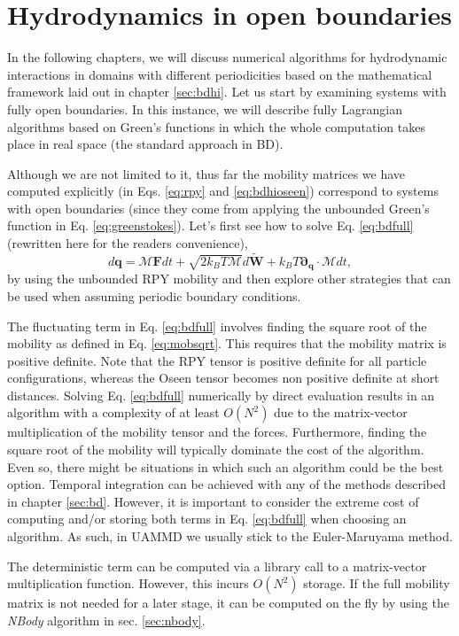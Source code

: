 \documentclass[ twoside,openright,titlepage,numbers=noenddot,%
headinclude,footinclude,cleardoublepage=empty,abstract=on,
BCOR=5mm,paper=b5,fontsize=11pt, dvipsnames
]{scrreprt}
\renewcommand{\vec}[1]{\bm{#1}}
\newcommand{\tens}[1]{\bm{\mathcal{#1}}}
\newcommand{\uammd}{\gls{UAMMD}\xspace}
\newcommand{\kT}{k_B T}
\newcommand{\noise}{\widetilde{W}}
\newcommand{\ppos}{q}
\begin{document}
\chapter{Hydrodynamics in open boundaries}
In the following chapters, we will discuss numerical algorithms for hydrodynamic interactions in domains with different periodicities based on the mathematical framework laid out in chapter \ref{sec:bdhi}. Let us start by examining systems with fully open boundaries. In this instance, we will describe fully Lagrangian algorithms based on Green's functions in which the whole computation takes place in real space (the standard approach in \gls{BD}).

Although we are not limited to it, thus far the mobility matrices we have computed explicitly (in Eqs. \eqref{eq:rpy} and \eqref{eq:bdhioseen}) correspond to systems with open boundaries (since they come from applying the unbounded Green's function in Eq. \eqref{eq:greenstokes}). Let's first see how to solve Eq. \eqref{eq:bdfull} (rewritten here for the readers convenience),
$$  d\vec{\ppos} =\tens{M}\vec{F}dt + \sqrt{2\kT\tens{M}}d\vec{\noise} + \kT\vec{\partial}_{\vec{\ppos}}\cdot\tens{M}dt,$$
by using the unbounded \gls{RPY} mobility and then explore other strategies that can be used when assuming periodic boundary conditions.

The fluctuating term in Eq. \eqref{eq:bdfull} involves finding the square root of the mobility as defined in Eq. \eqref{eq:mobsqrt}.
This requires that the mobility matrix is positive definite. Note that the \gls{RPY} tensor is positive definite for all particle configurations, whereas the Oseen tensor becomes non positive definite at short distances.
Solving Eq. \eqref{eq:bdfull} numerically by direct evaluation results in an algorithm with a complexity of at least $O(N^2)$ due to the matrix-vector multiplication of the mobility tensor and the forces. Furthermore, finding the square root of the mobility will typically dominate the cost of the algorithm. Even so, there might be situations in which such an algorithm could be the best option.
Temporal integration can be achieved with any of the methods described in chapter \ref{sec:bd}. However, it is important to consider the extreme cost of computing and/or storing both terms in Eq. \eqref{eq:bdfull} when choosing an algorithm. As such, in \uammd we usually stick to the Euler-Maruyama method.

The deterministic term can be computed via a library call to a matrix-vector multiplication function. However, this incurs $O(N^2)$ storage. If the full mobility matrix is not needed for a later stage, it can be computed on the fly by using the \emph{NBody} algorithm in sec. \ref{sec:nbody}.
\end{document}

